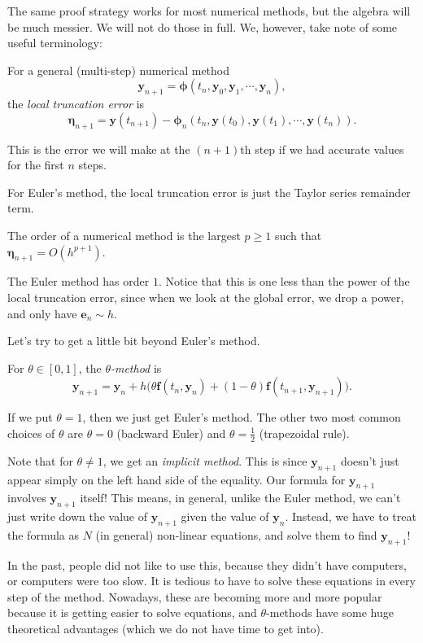 \documentclass[a4paper]{article}
\begin{document}
The same proof strategy works for most numerical methods, but the algebra will be much messier. We will not do those in full. We, however, take note of some useful terminology:
\begin{defi}
  For a general (multi-step) numerical method
  \[
    \mathbf{y}_{n + 1} = \boldsymbol\phi (t_n, \mathbf{y}_0, \mathbf{y}_1, \cdots,\mathbf{y}_n),
  \]
  the \emph{local truncation error} is
  \[
    \boldsymbol\eta_{n + 1} = \mathbf{y}(t_{n + 1}) - \boldsymbol\phi_n(t_n, \mathbf{y}(t_0), \mathbf{y}(t_1), \cdots, \mathbf{y}(t_n)).
  \]
\end{defi}
This is the error we will make at the $(n + 1)$th step if we had accurate values for the first $n$ steps.

For Euler's method, the local truncation error is just the Taylor series remainder term.

\begin{defi}[Order]
  The order of a numerical method is the largest $p \geq 1$ such that $\boldsymbol\eta_{n + 1} = O(h^{p + 1})$.
\end{defi}
The Euler method has order $1$. Notice that this is one less than the power of the local truncation error, since when we look at the global error, we drop a power, and only have $\mathbf{e}_n \sim h$.

Let's try to get a little bit beyond Euler's method.
\begin{defi}
  For $\theta \in [0, 1]$, the \emph{$\theta$-method} is
  \[
    \mathbf{y}_{n + 1} = \mathbf{y}_n + h\Big( \theta \mathbf{f}(t_n, \mathbf{y}_n) + (1 - \theta) \mathbf{f}(t_{n + 1}, \mathbf{y}_{n + 1})\Big).
  \]
\end{defi}
If we put $\theta = 1$, then we just get Euler's method. The other two most common choices of $\theta$ are $\theta = 0$ (backward Euler) and $\theta = \frac{1}2$ (trapezoidal rule).

Note that for $\theta \not= 1$, we get an \emph{implicit method}. This is since $\mathbf{y}_{n + 1}$ doesn't just appear simply on the left hand side of the equality. Our formula for $\mathbf{y}_{n + 1}$ involves $\mathbf{y}_{n + 1}$ itself! This means, in general, unlike the Euler method, we can't just write down the value of $\mathbf{y}_{n + 1}$ given the value of $\mathbf{y}_n$. Instead, we have to treat the formula as $N$ (in general) non-linear equations, and solve them to find $\mathbf{y}_{n + 1}$!

In the past, people did not like to use this, because they didn't have computers, or computers were too slow. It is tedious to have to solve these equations in every step of the method. Nowadays, these are becoming more and more popular because it is getting easier to solve equations, and $\theta$-methods have some huge theoretical advantages (which we do not have time to get into).
\end{document}
